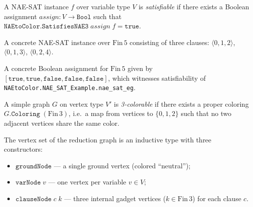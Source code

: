 \begin{definition}
\label{NAEtoColor.IsSatisfiable}
\leanok
{}
A NAE-SAT instance $f$ over variable type $V$ is \emph{satisfiable} if there
exists a Boolean assignment $\mathit{assign} : V \to \mathtt{Bool}$ such that
$\texttt{NAEtoColor.SatisfiesNAE3}\;\mathit{assign}\;f = \mathtt{true}$.
\end{definition}

\begin{definition}
\label{NAEtoColor.NAE_SAT_Example.nae_sat_eg}
\leanok
{}
A concrete NAE-SAT instance over $\mathrm{Fin}\,5$ consisting of three clauses:
$\langle 0,1,2\rangle$, $\langle 0,1,3\rangle$, $\langle 0,2,4\rangle$.
\end{definition}

\begin{definition}
\label{NAEtoColor.NAE_SAT_Example.assign_eg}
\leanok
A concrete Boolean assignment for $\mathrm{Fin}\,5$ given by
$\![{\mathtt{true}},{\mathtt{true}},{\mathtt{false}},{\mathtt{false}},{\mathtt{false}}]$,
which witnesses satisfiability of \texttt{NAEtoColor.NAE\_SAT\_Example.nae\_sat\_eg}.
\end{definition}

\begin{definition}[3-colorability]
\label{NAEtoColor.Is3Colorable}
\leanok
A simple graph $G$ on vertex type $V'$ is \emph{3-colorable} if there exists
a proper coloring $G.\mathtt{Coloring}\;(\mathrm{Fin}\,3)$, i.e.\ a map
from vertices to $\{0,1,2\}$ such that no two adjacent vertices share the same
color.
\end{definition}

\begin{definition}
\label{NAEtoColor.OutputVertex}
\leanok
{}
The vertex set of the reduction graph is an inductive type with three
constructors:
\begin{itemize}
  \item $\mathtt{groundNode}$ --- a single ground vertex (colored ``neutral'');
  \item $\mathtt{varNode}\;v$ --- one vertex per variable $v \in V$;
  \item $\mathtt{clauseNode}\;c\;k$ --- three internal gadget vertices
        ($k \in \mathrm{Fin}\,3$) for each clause $c$.
\end{itemize}
\end{definition}

